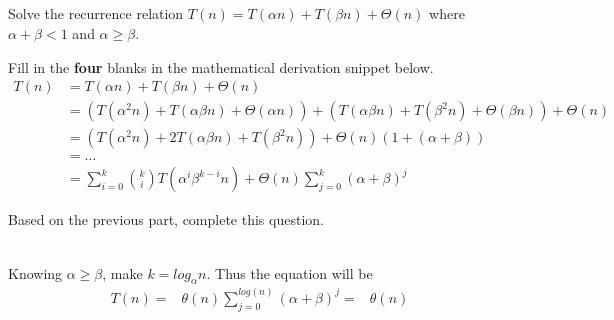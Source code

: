 \begin{parts}
    \part{} Solve the recurrence relation $T(n) = T(\alpha n) + T(\beta n) + \Theta(n)$ where $\alpha + \beta < 1$ and $\alpha \geq \beta$.
    \begin{subparts}
        \subpart[2] Fill in the \textbf{four} blanks in the mathematical derivation snippet below.
        \begin{align*}
            T(n) & = T(\alpha n) + T(\beta n) + \Theta(n)                                                                         \\
                 & = (T(\alpha ^2 n) + T(\alpha \beta n) + \Theta(\alpha n)) +
            (T(\alpha \beta n) + T(\beta ^2 n) + \Theta(\beta n)) + \Theta(n)                                                     \\
                 & = (T(\alpha ^2 n) + 2T(\alpha \beta n) + T(\beta ^2 n)) + \Theta(n) (1 + (\alpha + \beta))                     \\
                 & = \dots                                                                                                        \\
                 & = \sum _ {i=0} ^k \binom{k}{i} T(\alpha^i \beta^{k-i} n) + \Theta(n) \sum _ {j = 0} ^ {k} {(\alpha + \beta)^j}
        \end{align*}

        \subpart[3] Based on the previous part, complete this question.
        \begin{solution} \\
            Knowing $\alpha \ge \beta$, make $k = log_{\alpha}{n}$. Thus the equation will be
            \begin{equation}
                \begin{aligned}
                    T(n) = & \theta(n) \sum_{j=0}^{log(n)} (\alpha + \beta)^j
                    =      & \theta(n)
                \end{aligned}
            \end{equation}
        \end{solution}
    \end{subparts}


\end{parts}
